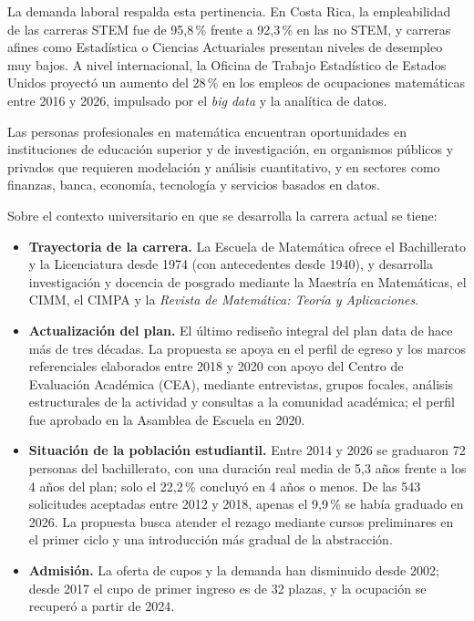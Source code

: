 \documentclass[11pt,a4paper]{article}
\begin{document}
La demanda laboral respalda esta pertinencia. En Costa Rica, la empleabilidad de las carreras STEM fue de 95,8\,\% frente a 92,3\,\% en las no STEM, y carreras afines como Estadística o Ciencias Actuariales presentan niveles de desempleo muy bajos. A nivel internacional, la Oficina de Trabajo Estadístico de Estados Unidos proyectó un aumento del 28\,\% en los empleos de ocupaciones matemáticas entre 2016 y 2026, impulsado por el \emph{big data} y la analítica de datos.

Las personas profesionales en matemática encuentran oportunidades en instituciones de educación superior y de investigación, en organismos públicos y privados que requieren modelación y análisis cuantitativo, y en sectores como finanzas, banca, economía, tecnología y servicios basados en datos. 

Sobre el contexto universitario en que se desarrolla la carrera actual se tiene:

\begin{itemize}
  \item \textbf{Trayectoria de la carrera.} La Escuela de Matemática ofrece el Bachillerato y la Licenciatura desde 1974 (con antecedentes desde 1940), y desarrolla investigación y docencia de posgrado mediante la Maestría en Matemáticas, el CIMM, el CIMPA y la \emph{Revista de Matemática: Teoría y Aplicaciones}. 
  \item \textbf{Actualización del plan.} El último rediseño integral del plan data de hace más de tres décadas. La propuesta se apoya en el perfil de egreso y los marcos referenciales elaborados entre 2018 y 2020 con apoyo del Centro de Evaluación Académica (CEA), mediante entrevistas, grupos focales, análisis estructurales de la actividad y consultas a la comunidad académica; el perfil fue aprobado en la Asamblea de Escuela en 2020.
  \item \textbf{Situación de la población estudiantil.} Entre 2014 y 2026 se graduaron 72 personas del bachillerato, con una duración real media de 5,3 años frente a los 4 años del plan; solo el 22,2\,\% concluyó en 4 años o menos. De las 543 solicitudes aceptadas entre 2012 y 2018, apenas el 9,9\,\% se había graduado en 2026. La propuesta busca atender el rezago mediante cursos preliminares en el primer ciclo y una introducción más gradual de la abstracción.
  \item \textbf{Admisión.} La oferta de cupos y la demanda han disminuido desde 2002; desde 2017 el cupo de primer ingreso es de 32 plazas, y la ocupación se recuperó a partir de 2024.
\end{itemize}
\end{document}
